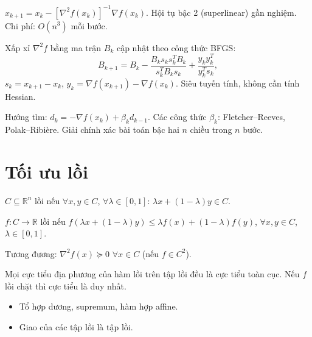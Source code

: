 \documentclass[12pt,a4paper]{article}
\begin{document}
\begin{phuongphap}[title={Phương pháp Newton}]
  $x_{k+1} = x_k - [\nabla^2 f(x_k)]^{-1}\nabla f(x_k)$. Hội tụ bậc 2 (superlinear) gần nghiệm. Chi phí: $O(n^3)$ mỗi bước.
\end{phuongphap}

\begin{phuongphap}[title={Quasi-Newton (BFGS)}]
  Xấp xỉ $\nabla^2 f$ bằng ma trận $B_k$ cập nhật theo công thức BFGS:
  \[
    B_{k+1} = B_k - \frac{B_k s_k s_k^T B_k}{s_k^T B_k s_k} + \frac{y_k y_k^T}{y_k^T s_k},
  \]
  $s_k = x_{k+1} - x_k$, $y_k = \nabla f(x_{k+1}) - \nabla f(x_k)$. Siêu tuyến tính, không cần tính Hessian.
\end{phuongphap}

\begin{phuongphap}[title={Gradient liên hợp (Conjugate Gradient)}]
  Hướng tìm: $d_k = -\nabla f(x_k) + \beta_k d_{k-1}$. Các công thức $\beta_k$: Fletcher--Reeves, Polak--Ribière. Giải chính xác bài toán bậc hai $n$ chiều trong $n$ bước.
\end{phuongphap}

\section{Tối ưu lồi}

\begin{dinhnghia}[title={Tập lồi}]
  $C \subseteq \mathbb{R}^n$ lồi nếu $\forall x, y \in C$, $\forall \lambda \in [0, 1]$: $\lambda x + (1-\lambda)y \in C$.
\end{dinhnghia}

\begin{dinhnghia}[title={Hàm lồi}]
  $f: C \to \mathbb{R}$ lồi nếu $f(\lambda x + (1-\lambda)y) \le \lambda f(x) + (1-\lambda)f(y)$, $\forall x, y \in C$, $\lambda \in [0, 1]$.

  Tương đương: $\nabla^2 f(x) \succeq 0$ $\forall x \in C$ (nếu $f \in C^2$).
\end{dinhnghia}

\begin{dinhly}
  Mọi cực tiểu địa phương của hàm lồi trên tập lồi đều là cực tiểu toàn cục. Nếu $f$ lồi chặt thì cực tiểu là duy nhất.
\end{dinhly}

\begin{tinhchat}[title={Phép toán bảo toàn tính lồi}]
  \begin{itemize}
    \item Tổ hợp dương, supremum, hàm hợp affine.
    \item Giao của các tập lồi là tập lồi.
  \end{itemize}
\end{tinhchat}
\end{document}
